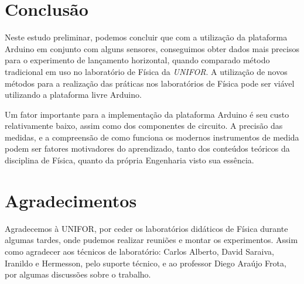 \documentclass[11pt,a4paper]{article}
\begin{document}
\section{Conclusão}

Neste estudo preliminar, podemos concluir que
com a utilização da plataforma Arduino em conjunto com alguns sensores, conseguimos obter dados mais precisos para o experimento de lançamento horizontal, quando comparado método tradicional em uso no laboratório de Física da \emph{UNIFOR}.
A utilização de novos métodos para a realização das práticas nos laboratórios de Física pode ser viável utilizando a plataforma livre Arduino.

Um fator importante para a implementação da plataforma Arduino é seu custo relativamente baixo, assim como dos componentes de circuito.
A precisão das medidas, e a compreensão de como funciona os modernos instrumentos de medida podem ser fatores motivadores do aprendizado, tanto dos conteúdos teóricos da disciplina de Física, quanto da própria Engenharia visto sua essência.




\section{Agradecimentos}

Agradecemos à UNIFOR, por ceder os laboratórios didáticos de Física durante algumas tardes, onde pudemos realizar reuniões e montar os experimentos.
Assim como agradecer aos técnicos de laboratório: Carlos Alberto, David Saraiva, Iranildo e Hermesson, pelo suporte técnico, e ao professor Diego Araújo Frota, por algumas discussões sobre o trabalho.



\printbibliography{}




\end{document}
